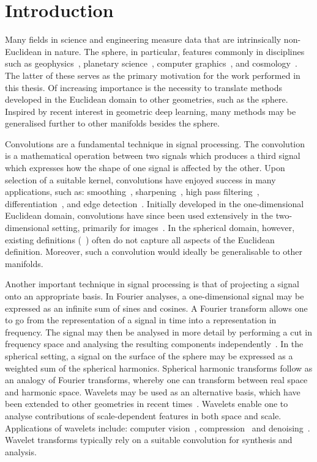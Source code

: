 \chapter{Introduction}\label{sec:chapter1}

Many fields in science and engineering measure data that are intrinsically non-Euclidean in nature.
The sphere, in particular, features commonly in disciplines such as geophysics~\cite{Simons2006}, planetary science~\cite{Turcotte1981}, computer graphics~\cite{Ramamoorthi2004}, and cosmology~\cite{Bennett1996}.
The latter of these serves as the primary motivation for the work performed in this thesis.
Of increasing importance is the necessity to translate methods developed in the Euclidean domain to other geometries, such as the sphere.
Inspired by recent interest in geometric deep learning, many methods may be generalised further to other manifolds besides the sphere.

Convolutions are a fundamental technique in signal processing.
The convolution is a mathematical operation between two signals which produces a third signal which expresses how the shape of one signal is affected by the other.
Upon selection of a suitable kernel, convolutions have enjoyed success in many applications, such as: smoothing~\cite{Gorry1990}, sharpening~\cite{Hu2020}, high pass filtering~\cite{Huang2009}, differentiation~\cite{Gorry1990}, and edge detection~\cite{Shen1996}.
Initially developed in the one-dimensional Euclidean domain, convolutions have since been used extensively in the two-dimensional setting, primarily for images~\cite{Rahmouni2017,Unser1995,Sahiner1996,Kumar2020}.
In the spherical domain, however, existing definitions (\eg{}~\cite{McEwen2007,Wei2011,Kennedy2011,Kennedy2011,Driscoll1994,Wandelt2001,Sadeghi2012,Khalid2012}) often do not capture all aspects of the Euclidean definition.
Moreover, such a convolution would ideally be generalisable to other manifolds.

Another important technique in signal processing is that of projecting a signal onto an appropriate basis.
In Fourier analyses, a one-dimensional signal may be expressed as an infinite sum of sines and cosines.
A Fourier transform allows one to go from the representation of a signal in time into a representation in frequency.
The signal may then be analysed in more detail by performing a cut in frequency space and analysing the resulting components independently~\cite{Mallat2008}.
In the spherical setting, a signal on the surface of the sphere may be expressed as a weighted sum of the spherical harmonics.
Spherical harmonic transforms follow as an analogy of Fourier transforms, whereby one can transform between real space and harmonic space.
Wavelets may be used as an alternative basis, which have been extended to other geometries in recent times~\cite{Pen1999,Barreiro2001,Rocha2004,McEwen2004,Audet2011,Audet2014,Loris2010,Simons2011,Simons2011b}.
Wavelets enable one to analyse contributions of scale-dependent features in both space and scale.
Applications of wavelets include: computer vision~\cite{Shi1997}, compression~\cite{Antonini1990,Mallat1992} and denoising~\cite{Mittermayr1996}.
Wavelet transforms typically rely on a suitable convolution for synthesis and analysis.

